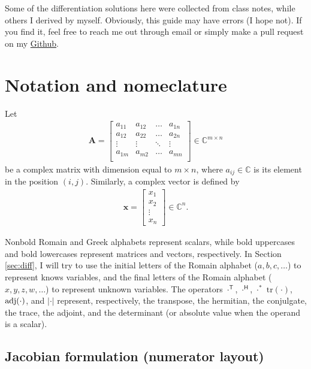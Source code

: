 \documentclass{article}
\newcommand{\trans}{\mathsf{T}}
\newcommand{\hermit}{\mathsf{H}}
\newcommand\abs[1]{\left\lvert#1\right\rvert}
\begin{document}
Some of the differentiation solutions here were collected from class notes, while others I derived by myself. Obviously, this guide may have errors (I hope not). If you find it, feel free to reach me out through email or simply make a pull request on my \href{https://github.com/tapyu/courses/tree/main/matrix_diff_ref}{Github}.

\section{Notation and nomeclature}

Let
\begin{align}
    \mathbf{A} = \begin{bmatrix}
        a_{11} & a_{12} & \dots & a_{1n} \\
        a_{12} & a_{22} & \dots & a_{2n} \\
        \vdots & \vdots & \ddots & \vdots \\
        a_{1m} & a_{m2} & \dots & a_{mn} \\
    \end{bmatrix} \in \mathbb{C}^{m \times n}
\end{align}
be a complex matrix with dimension equal to \(m \times n\), where \(a_{ij} \in \mathbb{C}\) is its element in the position \((i,j)\). Similarly, a complex vector is defined by
\begin{align}
    \mathbf{x} = \begin{bmatrix}
        x_1 \\
        x_2 \\
        \vdots \\
        x_n
    \end{bmatrix}  \in \mathbb{C}^{n}.
\end{align}

Nonbold Romain and Greek alphabets represent scalars, while bold uppercases and bold lowercases represent matrices and vectors, respectively. In Section \ref{sec:diff}, I will try to use the initial letters of the Romain alphabet (\(a, b, c, \dots\)) to represent knows variables, and the final letters of the Romain alphabet (\(x, y, z, w, \dots\)) to represent unknown variables. The operators \(\cdot^{\trans}\), \(\cdot^{\hermit}\), \(\cdot^*\) \(\text{tr}(\cdot)\), \(\textnormal{adj}(\cdot)\), and \(\abs{\cdot}\) represent, respectively, the transpose, the hermitian, the conjulgate, the trace, the adjoint, and the determinant (or absolute value when the operand is a scalar).

\subsection{Jacobian formulation (numerator layout)}
\end{document}
